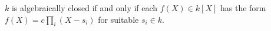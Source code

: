 $k$ is algebraically closed if and only if each $f(X) \in k[X]$ has the form $f(X) = c \prod_i (X - s_i)$ for suitable $s_i \in k$.
